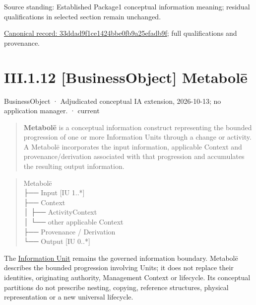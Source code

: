 Source standing: Established Package1 conceptual information meaning; residual qualifications in selected section remain unchanged.


{\footnotesize \href{../../../../continuum/business/business-object/33ddad9f1ce1424bbe0fb9a25efadb9f.md}{Canonical record: 33ddad9f1ce1424bbe0fb9a25efadb9f}; full qualifications and provenance.}\par
\section*{III.1.12 [BusinessObject] Metabolē}
\label{navigation:III.1.12}

\label{element:c34b4929f71946708d37dbe6c1da920a}
{\small BusinessObject · Adjudicated conceptual IA extension, 2026-10-13; no application manager. · current}\par

\begin{quote}


\textbf{Metabolē} is a conceptual information construct representing the bounded
progression of one or more Information Units through a change or activity.
A Metabolē incorporates the input information, applicable Context and
provenance/derivation associated with that progression and accumulates the
resulting output information.



\end{quote}


\begin{quote}\small\ttfamily
Metabolē\\
 ├── Input       [IU 1..*]\\
 ├── Context\\
 │    ├── ActivityContext\\
 │    └── other applicable Context\\
 ├── Provenance / Derivation\\
 └── Output      [IU 0..*]\\

\end{quote}


The \hyperref[element:10284034c8534b639284386b064f2c54]{Information Unit}
remains the governed information boundary. Metabolē describes the bounded
progression involving Units; it does not replace their identities, originating
authority, Management Context or lifecycle. Its conceptual partitions do not
prescribe nesting, copying, reference structures, physical representation or a
new universal lifecycle.



